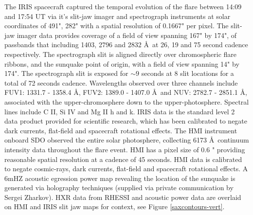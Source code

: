 The IRIS spacecraft captured the temporal evolution of the flare between 14:09 and 17:54 UT via it's slit-jaw imager and spectrograph instruments at solar coordinates of 491", 282" with a spatial resolution of 0.1667" per pixel. The slit-jaw imager data provides coverage of a field of view spanning 167" by 174", of passbands that including 1403, 2796 and 2832 \AA\ at 26, 19 and 75 second cadence respectively. The spectrograph slit is aligned directly over chromospheric flare ribbons, and the sunquake point of origin, with a field of view spanning 14" by 174". The spectrograph slit is exposed for $\sim9$ seconds at 8 slit locations for a total of 72 seconds cadence. Wavelengths observed over three channels include FUV1: 1331.7 - 1358.4 \AA, FUV2: 1389.0 - 1407.0 \AA\ and NUV: 2782.7 - 2851.1 \AA, associated with the upper-chromosphere down to the upper-photosphere. Spectral lines include C II, Si IV and Mg II h and k. IRIS data is the standard level 2 data product provided for scientific research, which has been calibrated to negate dark currents, flat-field and spacecraft rotational effects. The HMI instrument onboard SDO observed the entire solar photosphere, collecting 6173 \AA\ continuum intensity data throughout the flare event. HMI has a pixel size of 0.6 " providing reasonable spatial resolution at a cadence of 45 seconds. HMI data is calibrated to negate cosmic-rays, dark currents, flat-field and spacecraft rotational effects. A 6mHZ acoustic egression power map revealing the location of the sunquake is generated via holography techniques (supplied via private communication by Sergei Zharkov). HXR data from RHESSI and acoustic power data are overlaid on HMI and IRIS slit jaw maps for context, see Figure \ref{saxcontours-vert}.\\

